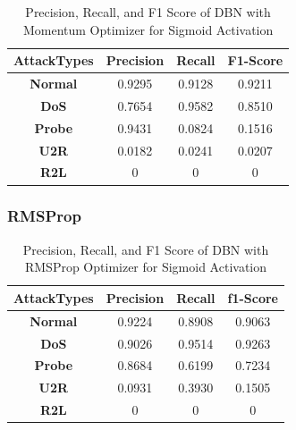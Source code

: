 \documentclass[12pt, a4paper]{report}
\begin{document}
\begin{table}[ht]
\centering
\captionsetup{justification=centering,margin=2cm}
\begin{tabular}{|c|c|c|c|}
\hline
\textbf{AttackTypes} & \multicolumn{1}{c|}{\textbf{Precision}} & \multicolumn{1}{c|}{\textbf{Recall}} & \multicolumn{1}{c|}{\textbf{F1-Score}} \\ \hline
\textbf{Normal}      & 0.9295                                   & 0.9128                                & 0.9211                                  \\ \hline
\textbf{DoS}         &0.7654                                   & 0.9582                                & 0.8510                                  \\ \hline
\textbf{Probe}       & 0.9431                                   & 0.0824                                & 0.1516                                  \\ \hline
\textbf{U2R}         &0.0182                                   & 0.0241                                & 0.0207                                  \\ \hline
\textbf{R2L}         & 0                                       & 0                                    & 0                                      \\ \hline
\end{tabular}
\caption{Precision, Recall, and F1 Score of DBN with Momentum Optimizer for Sigmoid Activation}
\label{prf1_mom_dbn}
\end{table}
\clearpage
\subsubsection{RMSProp}
\begin{table}[ht]
\centering
\captionsetup{justification=centering,margin=2cm}
\begin{tabular}{|c|c|c|c|}
\hline
\textbf{AttackTypes} & \multicolumn{1}{c|}{\textbf{Precision}} & \multicolumn{1}{c|}{\textbf{Recall}} & \multicolumn{1}{c|}{\textbf{f1-Score}} \\ \hline
\textbf{Normal}      & 0.9224                                  & 0.8908                               & 0.9063                                 \\ \hline
\textbf{DoS}         & 0.9026                                  & 0.9514                               & 0.9263                                 \\ \hline
\textbf{Probe}       & 0.8684                                  & 0.6199                               & 0.7234                                 \\ \hline
\textbf{U2R}         & 0.0931                                  & 0.3930                               & 0.1505                                 \\ \hline
\textbf{R2L}         & 0                                       & 0                                    & 0                                      \\ \hline
\end{tabular}
\caption{Precision, Recall, and F1 Score of DBN with RMSProp Optimizer for Sigmoid Activation}
\label{prf1_rms_dbn}
\end{table}
\end{document}
